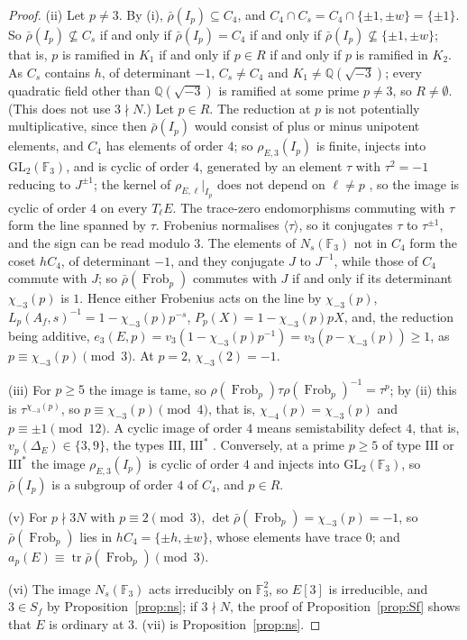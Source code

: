 \documentclass[11pt]{amsart}
\theoremstyle{definition}
\newcommand{\Q}{\mathbb{Q}}
\newcommand{\F}{\mathbb{F}}
\newcommand{\Frob}{\operatorname{Frob}}
\newcommand{\GL}{\mathrm{GL}}
\begin{document}
\begin{proof}
(ii) Let $p\ne3$. By (i), $\bar\rho(I_p)\subseteq C_4$, and $C_4\cap C_s=C_4\cap\{\pm1,\pm w\}=\{\pm1\}$. So $\bar\rho(I_p)\not\subseteq C_s$ if and only if $\bar\rho(I_p)=C_4$ if and only if $\bar\rho(I_p)\not\subseteq\{\pm1,\pm w\}$; that is, $p$ is ramified in $K_1$ if and only if $p\in R$ if and only if $p$ is ramified in $K_2$. As $C_s$ contains $h$, of determinant $-1$, $C_s\ne C_4$ and $K_1\ne\Q(\sqrt{-3})$; every quadratic field other than $\Q(\sqrt{-3})$ is ramified at some prime $p\ne3$, so $R\ne\emptyset$. (This does not use $3\nmid N$.) Let $p\in R$. The reduction at $p$ is not potentially multiplicative, since then $\bar\rho(I_p)$ would consist of plus or minus unipotent elements, and $C_4$ has elements of order $4$; so $\rho_{E,3}(I_p)$ is finite, injects into $\GL_2(\F_3)$, and is cyclic of order $4$, generated by an element $\tau$ with $\tau^2=-1$ reducing to $J^{\pm1}$; the kernel of $\rho_{E,\ell}|_{I_p}$ does not depend on $\ell\ne p$ \cite[\S2, Theorem 2(ii)]{SerreTate68}, so the image is cyclic of order $4$ on every $T_\ell E$. The trace-zero endomorphisms commuting with $\tau$ form the line spanned by $\tau$. Frobenius normalises $\langle\tau\rangle$, so it conjugates $\tau$ to $\tau^{\pm1}$, and the sign can be read modulo $3$. The elements of $N_s(\F_3)$ not in $C_4$ form the coset $hC_4$, of determinant $-1$, and they conjugate $J$ to $J^{-1}$, while those of $C_4$ commute with $J$; so $\bar\rho(\Frob_p)$ commutes with $J$ if and only if its determinant $\chi_{-3}(p)$ is $1$. Hence either Frobenius acts on the line by $\chi_{-3}(p)$, $L_p(A_f,s)^{-1}=1-\chi_{-3}(p)p^{-s}$, $P_p(X)=1-\chi_{-3}(p)pX$, and, the reduction being additive, $e_3(E,p)=v_3(1-\chi_{-3}(p)p^{-1})=v_3(p-\chi_{-3}(p))\ge1$, as $p\equiv\chi_{-3}(p)\pmod3$. At $p=2$, $\chi_{-3}(2)=-1$.

(iii) For $p\ge5$ the image is tame, so $\rho(\Frob_p)\tau\rho(\Frob_p)^{-1}=\tau^p$; by (ii) this is $\tau^{\chi_{-3}(p)}$, so $p\equiv\chi_{-3}(p)\pmod4$, that is, $\chi_{-4}(p)=\chi_{-3}(p)$ and $p\equiv\pm1\pmod{12}$. A cyclic image of order $4$ means semistability defect $4$, that is, $v_p(\Delta_E)\in\{3,9\}$, the types $\mathrm{III}$, $\mathrm{III}^*$ \cite{Kraus90}. Conversely, at a prime $p\ge5$ of type $\mathrm{III}$ or $\mathrm{III}^*$ the image $\rho_{E,3}(I_p)$ is cyclic of order $4$ \cite{Kraus90} and injects into $\GL_2(\F_3)$, so $\bar\rho(I_p)$ is a subgroup of order $4$ of $C_4$, and $p\in R$.

(v) For $p\nmid3N$ with $p\equiv2\pmod3$, $\det\bar\rho(\Frob_p)=\chi_{-3}(p)=-1$, so $\bar\rho(\Frob_p)$ lies in $hC_4=\{\pm h,\pm w\}$, whose elements have trace $0$; and $a_p(E)\equiv\operatorname{tr}\bar\rho(\Frob_p)\pmod3$.

(vi) The image $N_s(\F_3)$ acts irreducibly on $\F_3^2$, so $E[3]$ is irreducible, and $3\in S_f$ by Proposition~\ref{prop:ns}; if $3\nmid N$, the proof of Proposition~\ref{prop:Sf} shows that $E$ is ordinary at $3$. (vii) is Proposition~\ref{prop:ns}.
\end{proof}
\end{document}

